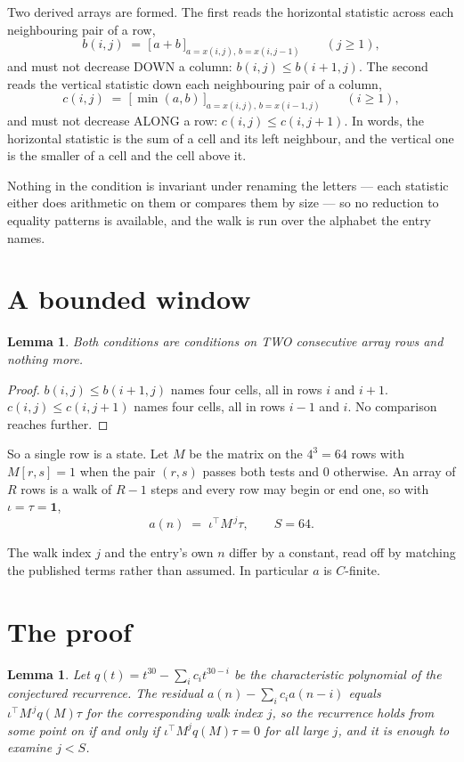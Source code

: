 \documentclass[11pt,a4paper]{article}
\theoremstyle{plain}
\newtheorem{lemma}[theorem]{Lemma}
\theoremstyle{definition}
\begin{document}
Two derived arrays are formed. The first reads the horizontal statistic across each
neighbouring pair of a row,
\[
b(i,j)\;=\;\bigl[\,a+b\,\bigr]_{a=x(i,j),\,b=x(i,j-1)}\qquad (j\ge1),
\]
and must not decrease DOWN a column: $b(i,j)\le b(i{+}1,j)$. The second reads the vertical
statistic down each neighbouring pair of a column,
\[
c(i,j)\;=\;\bigl[\,\min(a,b)\,\bigr]_{a=x(i,j),\,b=x(i{-}1,j)}\qquad (i\ge1),
\]
and must not decrease ALONG a row: $c(i,j)\le c(i,j{+}1)$. In words, the horizontal statistic
is the sum of a cell and its left neighbour, and the vertical one is
the smaller of a cell and the cell above it.

Nothing in the condition is invariant under renaming the letters --- each statistic either does
arithmetic on them or compares them by size --- so no reduction to equality patterns is
available, and the walk is run over the alphabet the entry names.

\section{A bounded window}

\begin{lemma}\label{lem:win}
Both conditions are conditions on TWO consecutive array rows and nothing more.
\end{lemma}

\begin{proof}
$b(i,j)\le b(i{+}1,j)$ names four cells, all in rows $i$ and $i+1$. $c(i,j)\le c(i,j{+}1)$
names four cells, all in rows $i-1$ and $i$. No comparison reaches further.
\end{proof}

So a single row is a state. Let $M$ be the matrix on the $4^{3}=64$ rows with
$M[r,s]=1$ when the pair $(r,s)$ passes both tests and $0$ otherwise. An array of $R$ rows is a
walk of $R-1$ steps and every row may begin or end one, so with $\iota=\tau=\mathbf{1}$,
\[
a(n)\;=\;\iota^{\!\top}M^{\,j}\tau ,\qquad S=64.
\]

The walk index $j$ and the entry's own $n$ differ by a constant, read off by matching the
published terms rather than assumed. In particular $a$ is $C$-finite.

\section{The proof}

\begin{lemma}\label{lem:crit}
Let $q(t)=t^{30}-\sum_i c_it^{30-i}$ be the characteristic polynomial of the
conjectured recurrence. The residual $a(n)-\sum_ic_ia(n-i)$ equals
$\iota^{\!\top}M^{\,j}q(M)\tau$ for the corresponding walk index $j$, so the recurrence
holds from some point on if and only if $\iota^{\!\top}M^{j}q(M)\tau=0$ for all large $j$,
and it is enough to examine $j<S$.
\end{lemma}
\end{document}
